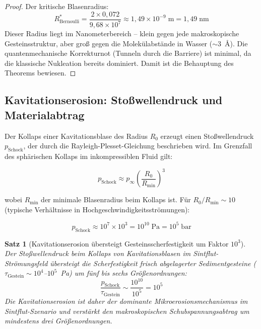 ﻿\documentclass[12pt,a4paper]{report}
\newtheorem{theorem}{Satz}[chapter]
\begin{document}
\begin{proof}
	Der kritische Blasenradius:
	\begin{equation}
		R^*_\mathrm{Bernoulli} = \frac{2\times0{,}072}{9{,}68\times10^7} \approx 1{,}49\times10^{-9}\;\text{m} = 1{,}49\;\text{nm}
		\label{eq:kritischer_radius_numerisch}
	\end{equation}
	Dieser Radius liegt im Nanometerbereich -- klein gegen jede makroskopische Gesteinsstruktur, aber groß gegen die Molekülabstände in Wasser ($\sim 3$~\AA). Die quantenmechanische Korrekturnot (Tunneln durch die Barriere) ist minimal, da die klassische Nukleation bereits dominiert. Damit ist die Behauptung des Theorems bewiesen.
\end{proof}

\subsection{Kavitationserosion: Stoßwellendruck und Materialabtrag}

Der Kollaps einer Kavitationsblase des Radius $R_0$ erzeugt einen Stoßwellendruck $p_\mathrm{Schock}$, der durch die Rayleigh-Plesset-Gleichung beschrieben wird. Im Grenzfall des sphärischen Kollaps im inkompressiblen Fluid gilt:

\begin{equation}
	p_\mathrm{Schock} \approx p_\infty\left(\frac{R_0}{R_\mathrm{min}}\right)^3
	\label{eq:schockdruck}
\end{equation}

wobei $R_\mathrm{min}$ der minimale Blasenradius beim Kollaps ist. Für $R_0/R_\mathrm{min} \sim 10$ (typische Verhältnisse in Hochgeschwindigkeitsströmungen):

\begin{equation}
	p_\mathrm{Schock} \approx 10^7 \times 10^3 = 10^{10}\;\text{Pa} = 10^5\;\text{bar}
	\label{eq:schockdruck_numerisch}
\end{equation}

\begin{theorem}[Kavitationserosion übersteigt Gesteinsscherfestigkeit um Faktor $10^3$]
	\label{thm:kavitationserosion}
	Der Stoßwellendruck beim Kollaps von Kavitationsblasen im Sintflut-Strömungsfeld übersteigt die Scherfestigkeit frisch abgelagerter Sedimentgesteine ($\tau_\mathrm{Gestein} \sim 10^4$--$10^5$~Pa) um fünf bis sechs Größenordnungen:
	\begin{equation}
		\frac{p_\mathrm{Schock}}{\tau_\mathrm{Gestein}} \sim \frac{10^{10}}{10^5} = 10^5
		\label{eq:erosion_verhaeltnis}
	\end{equation}
	Die Kavitationserosion ist daher der dominante Mikroerosionsmechanismus im Sintflut-Szenario und verstärkt den makroskopischen Schubspannungsabtrag um mindestens drei Größenordnungen.
\end{theorem}
\end{document}
